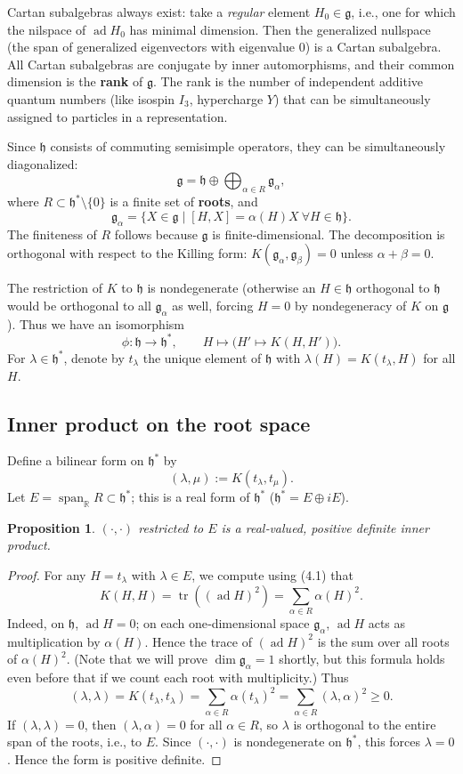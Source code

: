 \documentclass{article}
\newtheorem{proposition}[theorem]{Proposition}
\theoremstyle{definition}
\theoremstyle{remark}
\newcommand{\ad}{\operatorname{ad}}
\newcommand{\tr}{\operatorname{tr}}
\newcommand{\K}{K}
\newcommand{\g}{\mathfrak{g}}
\newcommand{\h}{\mathfrak{h}}
\newcommand{\R}{\mathbb{R}}
\newcommand{\Span}{\operatorname{span}}
\begin{document}
Cartan subalgebras always exist: take a \emph{regular} element $H_0\in\g$, i.e.,
one for which the nilspace of $\ad H_0$ has minimal dimension. Then the generalized
nullspace (the span of generalized eigenvectors with eigenvalue $0$) is a Cartan
subalgebra. All Cartan subalgebras are conjugate by inner automorphisms, and their
common dimension is the \textbf{rank} of $\g$. The rank is the number of independent
additive quantum numbers (like isospin $I_3$, hypercharge $Y$) that can be simultaneously
assigned to particles in a representation.

Since $\h$ consists of commuting semisimple operators, they can be simultaneously
diagonalized:
\[
\g = \h \oplus \bigoplus_{\alpha\in R} \g_\alpha,
\tag{4.1}
\]
where $R\subset\h^*\setminus\{0\}$ is a finite set of \textbf{roots}, and
\[
\g_\alpha = \{ X\in\g \mid [H,X] = \alpha(H)X\ \forall H\in\h\}.
\]
The finiteness of $R$ follows because $\g$ is finite‑dimensional. The decomposition
is orthogonal with respect to the Killing form: $\K(\g_\alpha,\g_\beta)=0$ unless
$\alpha+\beta=0$.

The restriction of $\K$ to $\h$ is nondegenerate (otherwise an $H\in\h$ orthogonal
to $\h$ would be orthogonal to all $\g_\alpha$ as well, forcing $H=0$ by nondegeneracy
of $\K$ on $\g$). Thus we have an isomorphism
\[
\phi:\h \longrightarrow \h^*,\qquad H \mapsto \big(H' \mapsto \K(H,H')\big).
\]
For $\lambda\in\h^*$, denote by $t_\lambda$ the unique element of $\h$ with
$\lambda(H) = \K(t_\lambda, H)$ for all $H$.

\subsection{Inner product on the root space}
Define a bilinear form on $\h^*$ by
\[
(\lambda,\mu) := \K(t_\lambda, t_\mu).
\]
Let $E = \Span_\R R \subset \h^*$; this is a real form of $\h^*$ ($\h^* = E\oplus iE$).

\begin{proposition}
$(\cdot,\cdot)$ restricted to $E$ is a real‑valued, positive definite inner product.
\end{proposition}
\begin{proof}
For any $H = t_\lambda$ with $\lambda\in E$, we compute using (4.1) that
\[
\K(H,H) = \tr((\ad H)^2) = \sum_{\alpha\in R} \alpha(H)^2.
\]
Indeed, on $\h$, $\ad H=0$; on each one‑dimensional space $\g_\alpha$, $\ad H$ acts as
multiplication by $\alpha(H)$. Hence the trace of $(\ad H)^2$ is the sum over all roots
of $\alpha(H)^2$. (Note that we will prove $\dim\g_\alpha=1$ shortly, but this formula
holds even before that if we count each root with multiplicity.)
Thus
\[
(\lambda,\lambda) = \K(t_\lambda,t_\lambda) = \sum_{\alpha\in R} \alpha(t_\lambda)^2
= \sum_{\alpha\in R} (\lambda,\alpha)^2 \ge 0.
\]
If $(\lambda,\lambda)=0$, then $(\lambda,\alpha)=0$ for all $\alpha\in R$, so $\lambda$
is orthogonal to the entire span of the roots, i.e., to $E$. Since $(\cdot,\cdot)$ is
nondegenerate on $\h^*$, this forces $\lambda=0$. Hence the form is positive definite.
\end{proof}
\end{document}
